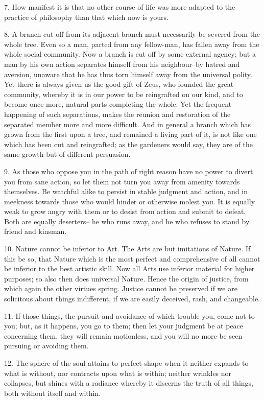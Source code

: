 \documentclass{book}
\begin{document}
7. How manifest it is that no other course of life was more adapted to
the practice of philosophy than that which now is yours.

8. A branch cut off from its adjacent branch must necessarily be
severed from the whole tree. Even so a man, parted from any
fellow-man, has fallen away from the whole social community. Now a
branch is cut off by some external agency; but a man by his own action
separates himself from his neighbour--by hatred and aversion, unaware
that he has thus torn himself away from the universal polity. Yet
there is always given us the good gift of Zeus, who founded the great
community, whereby it is in our power to be reingrafted on our kind,
and to become once more, natural parts completing the whole. Yet the
frequent happening of such separations, makes the reunion and
restoration of the separated member more and more difficult. And in
general a branch which has grown from the first upon a tree, and
remained a living part of it, is not like one which has been cut and
reingrafted; as the gardeners would say, they are of the same growth
but of different persuasion.

9. As those who oppose you in the path of right reason have no power
to divert you from sane action, so let them not turn you away from
amenity towards themselves. Be watchful alike to persist in stable
judgment and action, and in meekness towards those who would hinder or
otherwise molest you. It is equally weak to grow angry with them or to
desist from action and submit to defeat. Both are equally deserters--
he who runs away, and he who refuses to stand by friend and kinsman.

10. Nature cannot be inferior to Art. The Arts are but imitations of
Nature. If this be so, that Nature which is the most perfect and
comprehensive of all cannot be inferior to the best artistic
skill. Now all Arts use inferior material for higher purposes; so also
then does universal Nature. Hence the origin of justice, from which
again the other virtues spring. Justice cannot be preserved if we are
solicitous about things indifferent, if we are easily deceived, rash,
and changeable.

11. If those things, the pursuit and avoidance of which trouble you,
come not to you; but, as it happens, you go to them; then let your
judgment be at peace concerning them, they will remain motionless, and
you will no more be seen pursuing or avoiding them.

12. The sphere of the soul attains to perfect shape when it neither
expands to what is without, nor contracts upon what is within; neither
wrinkles nor collapses, but shines with a radiance whereby it discerns
the truth of all things, both without itself and within.
\end{document}
